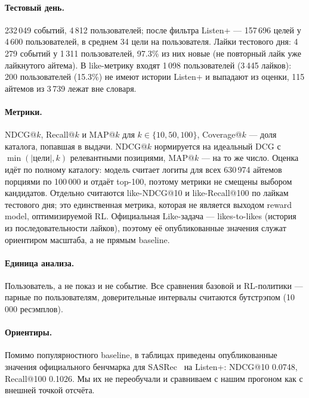 \paragraph{Тестовый день.} 232\,049 событий, 4\,812 пользователей; после
фильтра Listen+ --- 157\,696 целей у 4\,600 пользователей, в среднем 34
цели на пользователя. Лайки тестового дня: 4\,279 событий у 1\,311
пользователей, 97.3\% из них новые (не повторный лайк уже лайкнутого
айтема). В like-метрику входят 1\,098 пользователей (3\,445 лайков):
200 пользователей (15.3\%) не имеют истории Listen+ и выпадают из оценки,
115 айтемов из 3\,739 лежат вне словаря.

\paragraph{Метрики.} NDCG@$k$, Recall@$k$ и MAP@$k$ для
$k\in\{10,50,100\}$, Coverage@$k$ --- доля каталога, попавшая в выдачи.
NDCG@$k$ нормируется на идеальный DCG с $\min(|\text{цели}|, k)$
релевантными позициями, MAP@$k$ --- на то же число. Оценка идёт по полному
каталогу: модель считает логиты для всех 630\,974 айтемов порциями по
100\,000 и отдаёт top-100, поэтому метрики не смещены выбором кандидатов.
Отдельно считаются like-NDCG@10 и like-Recall@100 по лайкам тестового дня;
это единственная метрика, которая не является выходом reward model,
оптимизируемой RL. Официальная Like-задача --- likes-to-likes (история из
последовательности лайков), поэтому её опубликованные значения служат
ориентиром масштаба, а не прямым baseline.

\paragraph{Единица анализа.} Пользователь, а не показ и не событие. Все
сравнения базовой и RL-политики --- парные по пользователям, доверительные
интервалы считаются бутстрэпом (10\,000 ресэмплов).

\paragraph{Ориентиры.} Помимо популярностного baseline, в таблицах приведены
опубликованные значения официального бенчмарка для SASRec~\cite{sasrec} на
Listen+: NDCG@10 0.0748, Recall@100 0.1026. Мы их не переобучали и
сравниваем с нашим прогоном как с внешней точкой отсчёта.
